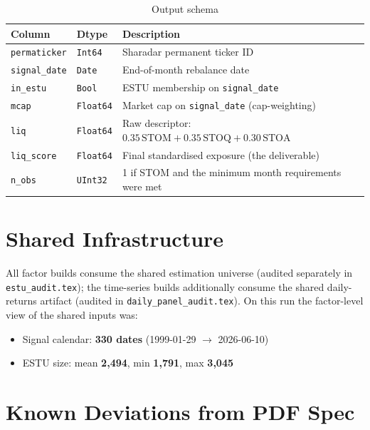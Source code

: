 \documentclass[11pt,a4paper]{article}
\begin{document}
\begin{table}[h!]
\centering
\caption{Output schema}
\begin{tabular}{llp{7.4cm}}
\toprule
\textbf{Column} & \textbf{Dtype} & \textbf{Description} \\
\midrule
\texttt{permaticker} & \texttt{Int64} & Sharadar permanent ticker ID \\
\texttt{signal\_date} & \texttt{Date} & End-of-month rebalance date \\
\texttt{in\_estu} & \texttt{Bool} & ESTU membership on \texttt{signal\_date} \\
\texttt{mcap} & \texttt{Float64} & Market cap on \texttt{signal\_date} (cap-weighting) \\
\texttt{liq} & \texttt{Float64} & Raw descriptor: $0.35\,\mathrm{STOM}+0.35\,\mathrm{STOQ}+0.30\,\mathrm{STOA}$ \\
\texttt{liq\_score} & \texttt{Float64} & Final standardised exposure (the deliverable) \\
\texttt{n\_obs} & \texttt{UInt32} & 1 if STOM and the minimum month requirements were met \\
\bottomrule
\end{tabular}
\end{table}

\section{Shared Infrastructure}

All factor builds consume the shared estimation universe
 (audited separately in
\texttt{estu\_audit.tex}); the time-series builds additionally consume the
shared daily-returns artifact (audited in \texttt{daily\_panel\_audit.tex}).
On this run the factor-level view of the shared inputs was:

\begin{itemize}[leftmargin=*,topsep=2pt,itemsep=2pt]
  \item Signal calendar: \textbf{330 dates} (1999-01-29 $\to$ 2026-06-10)
  \item ESTU size: mean \textbf{2{,}494}, min \textbf{1{,}791}, max \textbf{3{,}045}
\end{itemize}

\section{Known Deviations from PDF Spec}
\end{document}
